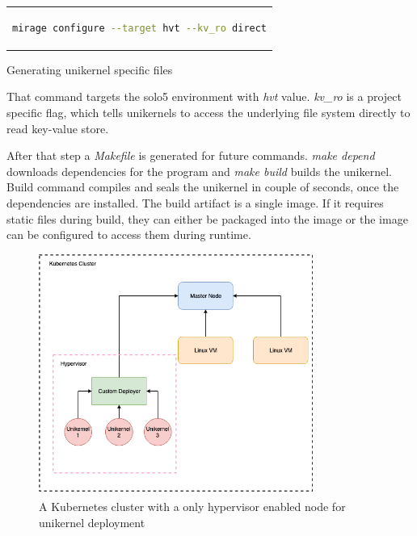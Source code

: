 \begin{code}[htpb]
    \centering
    \begin{tabular}{c}
    \begin{lstlisting}[language=bash]
      mirage configure --target hvt --kv_ro direct
  \end{lstlisting}
  \end{tabular}
  \caption{Generating unikernel specific files}\label{fig:mirage_configure}
\end{code}

That command targets the solo5 environment with \textit{hvt} value. \textit{kv\_ro} is a project specific flag, which tells unikernels to access the underlying file system directly to read key-value store.

After that step a \textit{Makefile} is generated for future commands. \textit{make depend} downloads dependencies for the program and \textit{make build} builds the unikernel. Build command compiles and seals the unikernel in couple of seconds, once the dependencies are installed. The build artifact is a single image. If it requires static files during build, they can either be packaged into the image or the image can be configured to access them during runtime.

\begin{figure}[htpb]
  \centering
  \includegraphics[width=0.8\textwidth]{figures/arch3.png}
  \caption{A Kubernetes cluster with a only hypervisor enabled node for unikernel deployment} \label{fig:hypervisor}
\end{figure}

